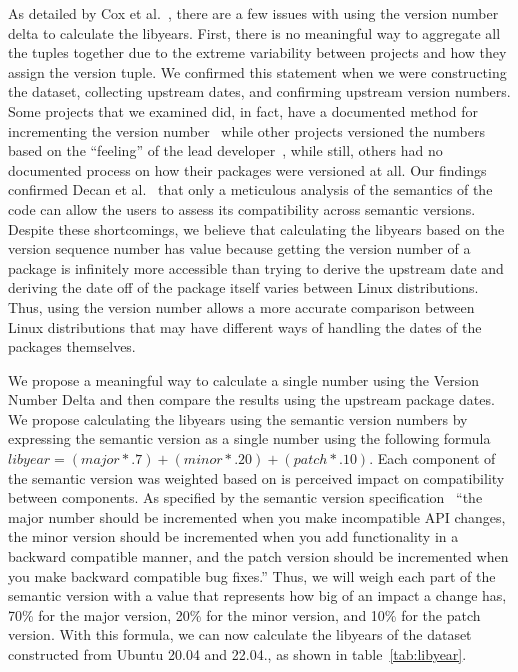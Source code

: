 \documentclass[sn-mathphys-num]{sn-jnl}%
\theoremstyle{thmstyleone}%
\theoremstyle{thmstyletwo}%
\theoremstyle{thmstylethree}%
\begin{document}
As detailed by Cox et al.~\cite{cox_measuring_2015}, there are a few issues with using the version number delta to calculate the libyears. First, there is no meaningful way to aggregate all the tuples together due to the extreme variability between projects and how they assign the version tuple. We confirmed this statement when we were constructing the dataset, collecting upstream dates, and confirming upstream version numbers. Some projects that we examined did, in fact, have a documented method for incrementing the version number~\cite{noauthor_versioning_2017} while other projects versioned the numbers based on the ``feeling'' of the lead developer~\cite{noauthor_interview_2021}, while still, others had no documented process on how their packages were versioned at all. Our findings confirmed Decan et al.~\cite{decan2019package} that only a meticulous
analysis of the semantics of the code can allow the users to assess its compatibility across semantic versions. Despite these shortcomings, we believe that calculating the libyears based on the version sequence number has value because getting the version number of a package is infinitely more accessible than trying to derive the upstream date and deriving the date off of the package itself varies between Linux distributions. Thus, using the version number allows a more accurate comparison between Linux distributions that may have different ways of handling the dates of the packages themselves.

We propose a meaningful way to calculate a single number using the Version Number Delta and then compare the results using the upstream package dates. We propose calculating the libyears using the semantic version numbers by expressing the semantic version as a single number using the following formula $libyear = (major * .7) + (minor * .20) + (patch *.10)$. Each component of the semantic version was weighted based on is perceived impact on compatibility between components. As specified by the semantic version specification~\cite{preston-werner_semantic_nodate} ``the major number should be incremented when you make incompatible API changes, the minor version should be incremented when you add functionality in a backward compatible manner, and the patch version should be incremented when you make backward compatible bug fixes.'' Thus, we will weigh each part of the semantic version with a value that represents how big of an impact a change has, 70\% for the major version, 20\% for the minor version, and 10\% for the patch version. With this formula, we can now calculate the libyears of the dataset constructed from Ubuntu 20.04 and 22.04., as shown in table~\ref{tab:libyear}.
\end{document}
